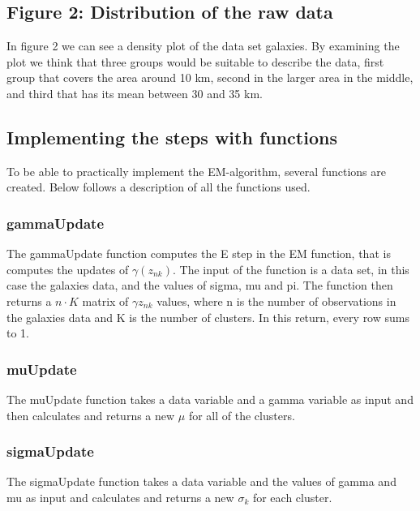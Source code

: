 \documentclass{article}\usepackage[]{graphicx}\usepackage[]{color}
\begin{document}
\subsection*{Figure 2: Distribution of the raw data}

In figure 2 we can see a density plot of the data set galaxies. By examining the plot we think that three groups would be suitable to describe the data, first group that covers the area around 10 km, second in the larger area in the middle, and third that has its mean between 30 and 35 km.

\subsection*{Implementing the steps with functions}

To be able to practically implement the EM-algorithm, several functions are created. Below follows a description of all the functions used.



\subsubsection*{gammaUpdate}
The gammaUpdate function computes the E step in the EM function, that is computes the updates of $ \gamma(z_{nk})  $. The input of the function is a data set, in this case the galaxies data, and the values of sigma, mu and pi. The function then returns a $n \cdot  K$ matrix of $\gamma{z_{nk}}  $  values, where n is the number of observations in the galaxies data and K is the number of clusters. In this return, every row sums to 1.



\subsubsection*{muUpdate}

The muUpdate function takes a data variable and a gamma variable as input and then calculates and returns a new $\mu$ for all of the clusters.



\subsubsection*{sigmaUpdate}
The sigmaUpdate function takes a data variable and the values of gamma and mu as input and calculates and returns a new $\sigma_k$ for each cluster.  
\end{document}
